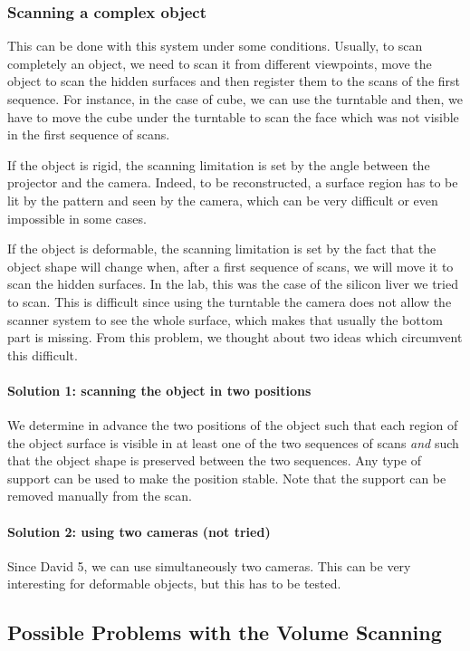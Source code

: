 \documentclass[11pt]{article}
\begin{document}
\subsubsection{Scanning a complex object}
This can be done with this system under some conditions.
Usually, to scan completely an object, we need to scan it from different viewpoints, move the object to scan the hidden surfaces and then register them to the scans of the first sequence.
For instance, in the case of cube, we can use the turntable and then, we have to move the cube under the turntable to scan the face which was not visible in the first sequence of scans.

If the object is rigid, the scanning limitation is set by the angle between the projector and the camera.
Indeed, to be reconstructed, a surface region has to be lit by the pattern and seen by the camera, which can be very difficult or even impossible in some cases.

If the object is deformable, the scanning limitation is set by the fact that the object shape will change when, after a first sequence of scans, we will move it to scan the hidden surfaces.
In the lab, this was the case of the silicon liver we tried to scan.
This is difficult since using the turntable the camera does not allow the scanner system to see the whole surface, which makes that usually the bottom part is missing.
From this problem, we thought about two ideas which circumvent this difficult.

\paragraph{Solution 1: scanning the object in two positions}
We determine in advance the two positions of the object such that each region of the object surface is visible in at least one of the two sequences of scans \emph{and} such that the object shape is preserved between the two sequences.
Any type of support can be used to make the position stable.
Note that the support can be removed manually from the scan.

\paragraph{Solution 2: using two cameras (not tried)}

Since David 5, we can use simultaneously two cameras.
This can be very interesting for deformable objects, but this has to be tested.

\subsection{Possible Problems with the Volume Scanning}
\end{document}
